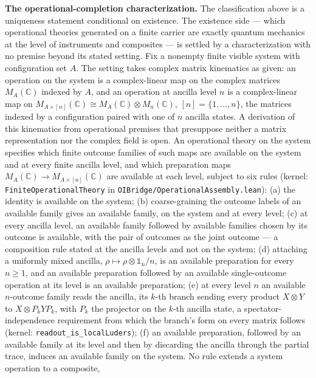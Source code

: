 \documentclass[
]{article}
\begin{document}
\textbf{The operational-completion characterization.} The classification
above is a uniqueness statement conditional on existence. The existence
side --- which operational theories generated on a finite carrier are
exactly quantum mechanics at the level of instruments and composites ---
is settled by a characterization with no premise beyond its stated
setting. Fix a nonempty finite visible system with configuration set
\(A\). The setting takes complex matrix kinematics as given: an
operation on the system is a complex-linear map on the complex matrices
\(M_A(\mathbb{C})\) indexed by \(A\), and an operation at ancilla level
\(n\) is a complex-linear map on
\(M_{A \times [n]}(\mathbb{C}) \cong M_A(\mathbb{C}) \otimes M_n(\mathbb{C})\),
\([n] = \{1, \ldots, n\}\), the matrices indexed by a configuration
paired with one of \(n\) ancilla states. A derivation of this kinematics
from operational premises that presuppose neither a matrix
representation nor the complex field is open. An operational theory on
the system specifies which finite outcome families of such maps are
available on the system and at every finite ancilla level, and which
preparation maps \(M_A(\mathbb{C}) \to M_{A \times [n]}(\mathbb{C})\)
are available at each level, subject to six rules (kernel:
\texttt{FiniteOperationalTheory} in
\texttt{OIBridge/OperationalAssembly.lean}): (a) the identity is
available on the system; (b) coarse-graining the outcome labels of an
available family gives an available family, on the system and at every
level; (c) at every ancilla level, an available family followed by
available families chosen by its outcome is available, with the pair of
outcomes as the joint outcome --- a composition rule stated at the
ancilla levels and not on the system; (d) attaching a uniformly mixed
ancilla, \(\rho \mapsto \rho \otimes \mathbb{1}_n/n\), is an available
preparation for every \(n \geq 1\), and an available preparation
followed by an available single-outcome operation at its level is an
available preparation; (e) at every level \(n\) an available
\(n\)-outcome family reads the ancilla, its \(k\)-th branch sending
every product \(X \otimes Y\) to \(X \otimes P_k Y P_k\), with \(P_k\)
the projector on the \(k\)-th ancilla state, a spectator-independence
requirement from which the branch's form on every matrix follows
(kernel: \texttt{readout\_is\_localLuders}); (f) an available
preparation, followed by an available family at its level and then by
discarding the ancilla through the partial trace, induces an available
family on the system. No rule extends a system operation to a composite,
\end{document}
